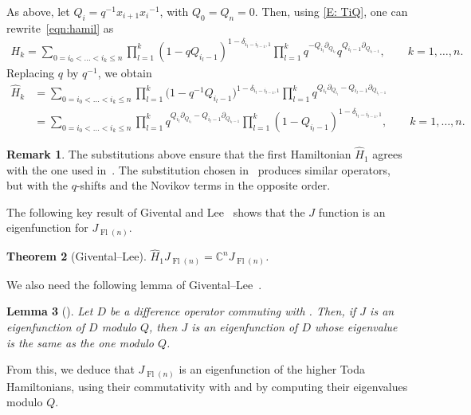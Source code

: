\documentclass[pdftex]{sigma}
\numberwithin{equation}{section}
\newtheorem{Theorem}{Theorem}[section]
\newtheorem{Lemma}[Theorem]{Lemma}
\theoremstyle{definition}
\newtheorem{Remark}[Theorem]{Remark}
\DeclareMathOperator{\Fl}{Fl}
\begin{document}
As above, let $Q_i=q^{-1}{x_{i+1}}{x_i}^{-1}$, with $Q_0=Q_n=0$. Then, using
\eqref{E: TiQ}, one can rewrite~\eqref{eqn:hamil} as
\begin{align*}
 H_k=\sum_{0= i_0<\dots<i_k\leq n} \prod_{l=1}^{k}(1-qQ_{i_l-1})^{1-\delta_{i_l-i_{l-1},1}} \prod_{l=1}^{k} q^{-Q_{i_l}\partial_{Q_{i_l}}}q^{Q_{i_l-1}\partial_{Q_{i_l-1}}},\qquad k=1,\dots,n.
\end{align*}
Replacing $q$ by $q^{-1}$, we obtain
\begin{align*}%
 \widehat{H}_k&{}= \sum_{0= i_0<\dots<i_k\leq n}\prod_{l=1}^{k}\bigl(1-q^{-1}Q_{{i_l}-1}\bigr)^{1-\delta_{i_l-i_{l-1},1}} \prod_{l=1}^{k} q^{Q_{i_l}\partial_{Q_{i_l}}-Q_{i_l-1}\partial_{Q_{{i_l}-1}}}\\
 &{}=\sum_{0= i_0<\dots<i_k\leq n} \prod_{l=1}^{k} q^{Q_{i_l}\partial_{Q_{i_l}}-Q_{i_l-1}\partial_{Q_{{i_l}-1}}}\prod_{l=1}^{k}(1-Q_{{i_l}-1})^{1-\delta_{i_l-i_{l-1},1}}
 ,\qquad k=1,\dots,n .
 \end{align*}
\begin{Remark} The substitutions above
ensure that the first Hamiltonian $\widehat{H}_1$ agrees
with the one used in~\cite{givental_lee}. The substitution chosen in~\cite{act:2017}
produces similar
operators, but with the $q$-shifts and the Novikov terms in the opposite order.
\end{Remark}
The following key result of Givental and Lee~\cite[Theorem~2]{givental_lee} shows that the $J$ function is an eigenfunction for $J_{\Fl(n)}$.

\begin{Theorem}[Givental--Lee]\label{thm:GLeemain}
 $\widehat{H}_1J_{\Fl(n)}=\mathbb{C}^n J_{\Fl(n)}$.
\end{Theorem}

We also need the following lemma of Givental--Lee~\cite{givental_lee}.

\begin{Lemma}[{\cite[p.~9]{givental_lee}}]\label{lemma:modQ}
Let $D$ be a difference operator commuting with . Then, if $J$ is an eigenfunction of $D$ modulo $Q$, then $J$ is an eigenfunction of $D$ whose eigenvalue is the same as the one modulo $Q$.
\end{Lemma}

From this, we deduce that $J_{\Fl(n)}$ is an eigenfunction of the higher Toda Hamiltonians, using their commutativity with  and by computing their eigenvalues modulo $Q$.
\end{document}
